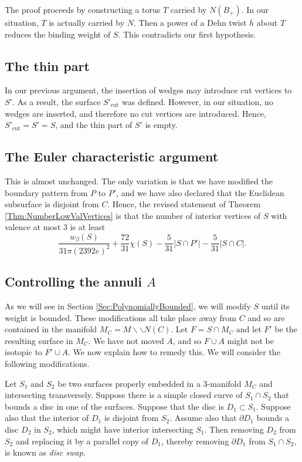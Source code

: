 \documentclass[oneside]{amsart}
\numberwithin{equation}{section}
\theoremstyle{plain}
\theoremstyle{definition}
\newcommand{\cut}{\backslash\backslash}
\begin{document}
The proof proceeds by constructing a torus $T$ carried by $N(B_+)$. In our situation,
$T$ is actually carried by $N$. Then a power of a Dehn twist $h$ about $T$ reduces the binding
weight of $S$. This contradicts our first hypothesis.

\subsection{The thin part} In our previous argument, the insertion of wedges may introduce cut vertices to $S'$.
As a result, the surface $S'_\mathrm{cut}$ was defined. However, in our situation, no
wedges are inserted, and therefore no cut vertices are introduced. Hence, $S'_\mathrm{cut} =
S' = S$, and the thin part of $S'$ is empty.

\subsection{The Euler characteristic argument} This is almost unchanged. The only variation
is that we have modified the boundary pattern from $P$ to $P'$, and we have also declared
that the Euclidean subsurface is disjoint from $C$. Hence, the revised statement of
Theorem \ref{Thm:NumberLowValVertices} is that the number of interior vertices of $S$ with valence
at most $3$ is at least
$$\frac{w_\beta(S)}{31\pi (2392e)^2} +  \frac{72}{31}\chi(S) - \frac{5}{31}|S \cap P'| - \frac{5}{31}|S \cap C|.$$

\subsection{Controlling the annuli $A$}
\label{Sec:DiscSwaps}

As we will see in Section \ref{Sec:PolynomiallyBounded}, we will modify $S$ until its
weight is bounded. These modifications all take place away from $C$ and so are contained
in the manifold $M_C = M \cut N(C)$. Let $F = S \cap M_C$ and let $F'$ be the resulting surface
in $M_C$. We have not moved $A$,
and so $F\cup A$ might not be isotopic to $F' \cup A$. We now explain how to remedy
this. We will consider the following modifications.

Let $S_1$ and $S_2$ be two surfaces properly embedded in a 3-manifold $M_C$ and
intersecting transversely. Suppose there is a simple closed curve of $S_1 \cap S_2$
that bounds a disc in one of the surfaces. Suppose that the disc is $D_1 \subset S_1$.
Suppose also that the interior of $D_1$ is disjoint from $S_2$. Assume also that $\partial D_1$
bounds a disc $D_2$ in $S_2$, which might have interior intersecting $S_1$. Then 
removing $D_2$ from $S_2$ and replacing it by a parallel copy of $D_1$, thereby removing
$\partial D_1$ from $S_1 \cap S_2$, is known as \emph{disc swap}.
\end{document}
